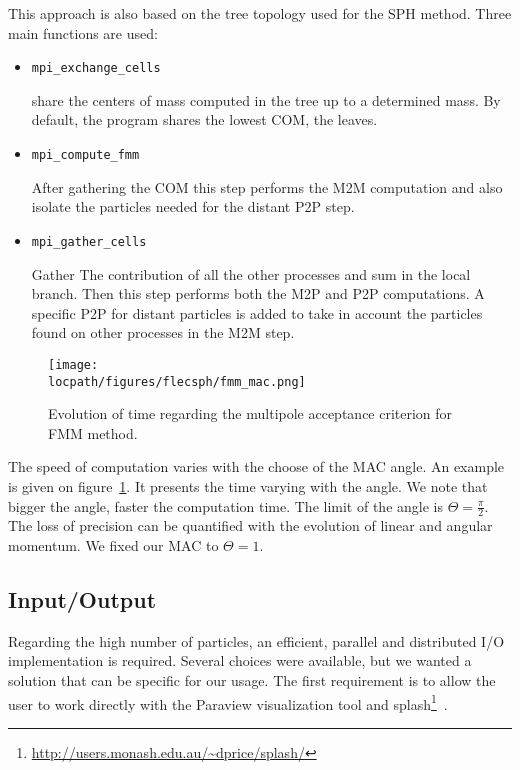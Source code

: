 This approach is also based on the tree topology used for the SPH method. 
Three main functions are used: 
\begin{itemize}
	\item \begin{verbatim}mpi_exchange_cells\end{verbatim} share the centers of mass computed in the tree up to a determined mass. By default, the program shares the lowest COM, the leaves. 
	\item \begin{verbatim}mpi_compute_fmm\end{verbatim} After gathering the COM this step performs the M2M computation and also isolate the particles needed for the distant P2P step. 
	\item \begin{verbatim}mpi_gather_cells\end{verbatim} Gather The contribution of all the other processes and sum in the local branch.
	Then this step performs both the M2P and P2P computations. 
	A specific P2P for distant particles is added to take in account the particles found on other processes in the M2M step.
\end{itemize}

\begin{figure}[t!]
\centering
\texttt{[image: \\locpath/figures/flecsph/fmm\_mac.png]}
\caption{Evolution of time regarding the multipole acceptance criterion for FMM method.}
\label{fig:mac_angle}
\end{figure}

The speed of computation varies with the choose of the MAC angle. 
An example is given on figure~\ref{fig:mac_angle}.
It presents the time varying with the angle. 
We note that bigger the angle, faster the computation time. 
The limit of the angle is $\Theta =  \frac{\pi}{2}$.
The loss of precision can be quantified with the evolution of linear and angular momentum.
We fixed our MAC to $\Theta = 1$.

\subsection{Input/Output}
Regarding the high number of particles, an efficient, parallel and distributed I/O implementation is required. 
Several choices were available, but we wanted a solution that can be specific for our usage. 
The first requirement is to allow the user to work directly with the Paraview visualization tool and splash\footnote{\url{http://users.monash.edu.au/~dprice/splash/}}~\cite{price2007splash}.

